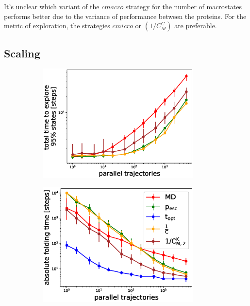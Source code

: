 It's unclear which variant of the $cmacro$ strategy for the number of macrostates performs better due to the variance of performance between the proteins. For the metric of exploration, the strategies $cmicro$ or  $(1/C_M^C)$ are preferable. 

\subsection{\label{sec:scaling}Scaling}

\begin{figure}[H]
  \begin{subfigure}[t]{0.5\textwidth}
    \includegraphics[width=0.9\textwidth]{figures/1FME_6_steps10000_scaling_explore_total.eps}   
  \end{subfigure}
  \begin{subfigure}[t]{0.5\textwidth}
    \includegraphics[width=0.9\textwidth]{figures/GTT_6_steps10000_scaling_fold0.eps}    

\end{subfigure}
\end{figure}
